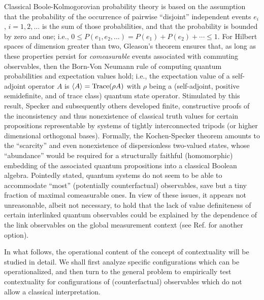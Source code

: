 Classical Boole-Kolmogorovian probability theory is based on the assumption
that the probability of the occurrence
of pairwise ``disjoint'' independent events $e_i$, $i=1,2, \ldots$
is the sum of those probabilities, and that the probability is bounded by zero and one;
i.e.,
$0\le  P(e_1,e_2,\ldots )= P(e_1)+P(e_2)+\cdots \le 1$.
For Hilbert spaces of dimension greater than two,
Gleason's theorem ensures that,
as long as these properties persist for {\it comeasurable} events associated with
commuting observables,
then the Born-Von Neumann rule
of computing quantum probabilities and expectation values \cite{v-neumann-49} hold;
i.e.,
the expectation value of a self-adjoint operator $A$ is
$\langle A\rangle ={\rm Trace}(\rho A)$
with $\rho$ being a (self-adjoint, positive semidefinite, and of trace class)
quantum state operator.
Stimulated by this result, Specker \cite{specker-60}
and subsequently others
developed  finite, constructive proofs
of the inconsistency and thus nonexistence of classical truth values for certain
propositions representable by
systems of tightly interconnected tripods (or higher dimensional orthogonal bases).
Formally, the Kochen-Specker theorem amounts to the ``scarcity''
and even nonexistence of dispersionless two-valued states,
whose ``abundance'' would be required for a structurally faithful (homomorphic)
embedding of the associated quantum propositions
into a classical Boolean algebra.
Pointedly stated, quantum systems do not seem to be able to accommodate
``most'' (potentially counterfactual) observables,
save but a tiny fraction of maximal comeasurable ones.
In view of these issues, it  appears not unreasonable, albeit not necessary,
to hold that the lack of value definiteness
of certain interlinked quantum observables
could be explained by the dependence of the link observables on the global measurement context
(see Ref. \cite{svozil-2003-garda} for another option).


In what follows, the operational content of the concept of contextuality will be studied
in detail.
We shall first analyze specific configurations which can be operationalized,
and then turn to the general problem to empirically test contextuality
for configurations of (counterfactual) observables
which do not allow a classical interpretation.




